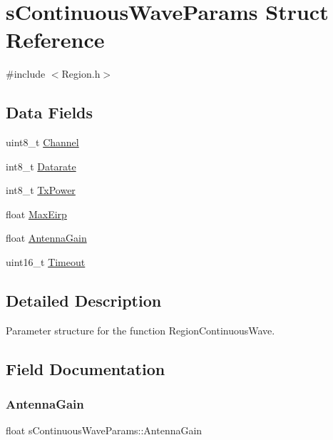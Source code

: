 \hypertarget{structsContinuousWaveParams}{}\section{s\+Continuous\+Wave\+Params Struct Reference}
\label{structsContinuousWaveParams}


{\ttfamily \#include $<$Region.\+h$>$}

\subsection*{Data Fields}
\begin{DoxyCompactItemize}
\item 
uint8\+\_\+t \hyperlink{structsContinuousWaveParams_a988ab1a71689757a1ad4fefa502bca02}{Channel}
\item 
int8\+\_\+t \hyperlink{structsContinuousWaveParams_a34ca1b53769fbf5efd5ca962d9fc4c73}{Datarate}
\item 
int8\+\_\+t \hyperlink{structsContinuousWaveParams_aea26241974fa9dac3fa5356a932eedec}{Tx\+Power}
\item 
float \hyperlink{structsContinuousWaveParams_a7da89b73ac0c83e19cfffa9b9bc3496c}{Max\+Eirp}
\item 
float \hyperlink{structsContinuousWaveParams_a42dbd1fc342fdee2da56000fc912571f}{Antenna\+Gain}
\item 
uint16\+\_\+t \hyperlink{structsContinuousWaveParams_ace37bba3a665e1c6957453e6dfb4d5ff}{Timeout}
\end{DoxyCompactItemize}


\subsection{Detailed Description}
Parameter structure for the function Region\+Continuous\+Wave. 

\subsection{Field Documentation}
\mbox{\label{structsContinuousWaveParams_a42dbd1fc342fdee2da56000fc912571f}} 
\subsubsection{\texorpdfstring{Antenna\+Gain}{AntennaGain}}
{\footnotesize\ttfamily float s\+Continuous\+Wave\+Params\+::\+Antenna\+Gain}

